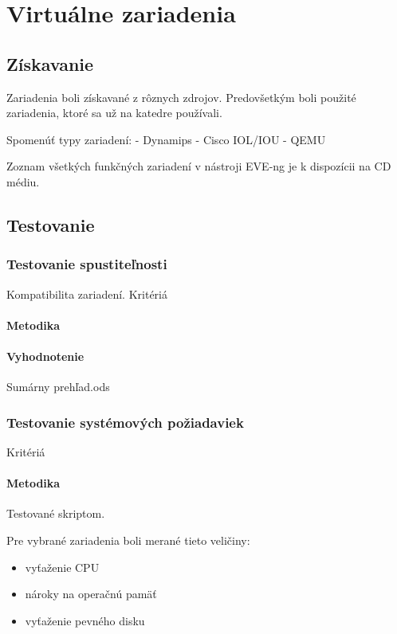 \chapter{Virtuálne zariadenia}

\section{Získavanie}

Zariadenia boli získavané z rôznych zdrojov. Predovšetkým boli použité zariadenia, ktoré sa už na katedre používali.

Spomenúť typy zariadení:
  - Dynamips
  - Cisco IOL/IOU
  - QEMU
  
Zoznam všetkých funkčných zariadení v nástroji EVE-ng je k dispozícii na CD médiu.

\section{Testovanie}

\subsection{Testovanie spustiteľnosti}

Kompatibilita zariadení.
Kritériá

\subsubsection{Metodika}

\subsubsection{Vyhodnotenie}

Sumárny prehľad.ods

\subsection{Testovanie systémových požiadaviek}

Kritériá

\subsubsection{Metodika}

Testované skriptom.


Pre vybrané zariadenia boli merané tieto veličiny:
\begin{itemize}
\item vyťaženie CPU
\item nároky na operačnú pamäť
\item vyťaženie pevného disku
\end{itemize}

